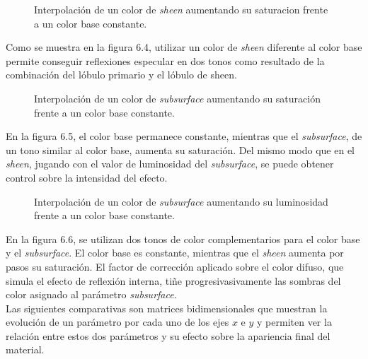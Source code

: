 \begin{figure}[H]
  \vspace{0.5cm}
  \centering
  \caption{Interpolaci\'on de un color de \textit{sheen} aumentando su saturacion frente a un color base constante.}
\end{figure}
\singlespacing

Como se muestra en la figura 6.4, utilizar un color de \textit{sheen} diferente al color base permite conseguir reflexiones especular en dos tonos como
resultado de la combinaci\'on del l\'obulo primario y el l\'obulo de sheen.

\begin{figure}[H]
  \vspace{0.5cm}
  \centering
    \caption{Interpolaci\'on de un color de \textit{subsurface} aumentando su saturaci\'on frente a un color base constante.}
\end{figure}
\singlespacing

En la figura 6.5, el color base permanece constante, mientras que el \textit{subsurface}, de un tono similar al color base,
aumenta su saturaci\'on. Del mismo modo que en el \textit{sheen}, jugando con el valor de luminosidad del \textit{subsurface},
se puede obtener control sobre la intensidad del efecto.


\begin{figure}[H]
  \vspace{0.5cm}
  \centering
    \caption{Interpolaci\'on de un color de \textit{subsurface} aumentando su luminosidad frente a un color base constante.}
 \end{figure}
\singlespacing

En la figura 6.6, se utilizan dos tonos de color complementarios para el color base y el \textit{subsurface}. El color
base es constante, mientras que el \textit{sheen} aumenta por pasos su saturaci\'on.
El factor de correcci\'on aplicado sobre el color difuso, que simula el efecto de reflexi\'on interna, ti\~ne progresivasivamente
las sombras del color asignado al par\'ametro \textit{subsurface}.\\

Las siguientes comparativas son matrices bidimensionales que muestran la evoluci\'on de un par\'ametro por cada uno de los ejes
$x$ e $y$ y permiten ver la relaci\'on entre estos dos par\'ametros y su efecto sobre la apariencia final del material.\\

